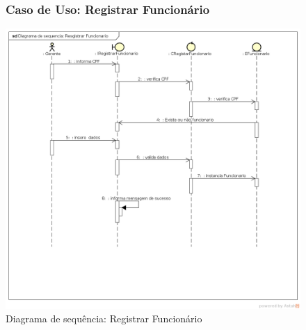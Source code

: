 \documentclass[
	12pt,				%
	openright,
	oneside,			%
	a4paper,			%
	chapter=TITLE,		%
	brazil				%
	]{abntex2}
\begin{document}
\begin{figure}[h!]

\subsubsection*{Caso de Uso: Registrar Funcionário}

	\caption{Diagrama de sequência: Registrar Funcionário}
	\begin{center}
	    \includegraphics[scale=0.5]{Arquivos/Analise/D_registrar_funcionario}  
	\end{center}
\end{figure}
\end{document}
